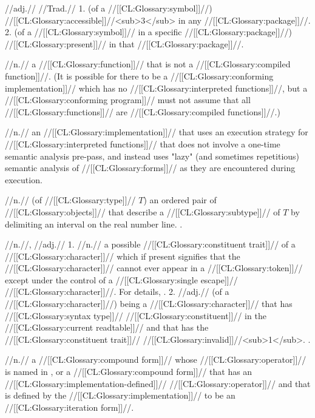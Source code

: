  //adj.// //Trad.// 1. (of a //[[CL:Glossary:symbol]]//) //[[CL:Glossary:accessible]]//<sub>3</sub> in any //[[CL:Glossary:package]]//. 2. (of a //[[CL:Glossary:symbol]]// in a specific //[[CL:Glossary:package]]//) //[[CL:Glossary:present]]// in that //[[CL:Glossary:package]]//.

 //n.// a //[[CL:Glossary:function]]// that is not a //[[CL:Glossary:compiled function]]//. (It is possible for there to be a //[[CL:Glossary:conforming implementation]]// which has no //[[CL:Glossary:interpreted functions]]//, but a //[[CL:Glossary:conforming program]]// must not assume that all //[[CL:Glossary:functions]]// are //[[CL:Glossary:compiled functions]]//.)

 //n.// an //[[CL:Glossary:implementation]]// that uses an execution strategy for //[[CL:Glossary:interpreted functions]]// that does not involve a one-time semantic analysis pre-pass, and instead uses "lazy" (and sometimes repetitious) semantic analysis of //[[CL:Glossary:forms]]// as they are encountered during execution.

 //n.// (of //[[CL:Glossary:type]]// $T$) an ordered pair of //[[CL:Glossary:objects]]// that describe a //[[CL:Glossary:subtype]]// of $T$ by delimiting an interval on the real number line. \Seesection\IntervalDesignators.

 //n.//, //adj.// 1. //n.// a possible //[[CL:Glossary:constituent trait]]// of a //[[CL:Glossary:character]]// which if present signifies that the //[[CL:Glossary:character]]// cannot ever appear in a //[[CL:Glossary:token]]// except under the control of a //[[CL:Glossary:single escape]]// //[[CL:Glossary:character]]//. For details, \seesection\ConstituentChars. 2. //adj.// (of a //[[CL:Glossary:character]]//) being a //[[CL:Glossary:character]]// that has //[[CL:Glossary:syntax type]]// //[[CL:Glossary:constituent]]// in the //[[CL:Glossary:current readtable]]// and that has the //[[CL:Glossary:constituent trait]]// //[[CL:Glossary:invalid]]//<sub>1</sub>. \Seefigure\ConstituentTraitsOfStdChars.

 //n.// a //[[CL:Glossary:compound form]]// whose //[[CL:Glossary:operator]]// is named in \thenextfigure, or a //[[CL:Glossary:compound form]]// that has an //[[CL:Glossary:implementation-defined]]// //[[CL:Glossary:operator]]// and that is defined by the //[[CL:Glossary:implementation]]// to be an //[[CL:Glossary:iteration form]]//.

